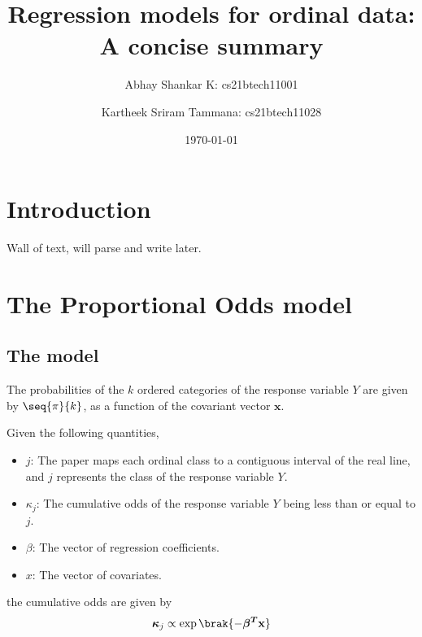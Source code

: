 \documentclass{amsart}
\begin{document}
    \title{Regression models for ordinal data: A concise summary}
    \author{Abhay Shankar K: cs21btech11001}
    \author{Kartheek Sriram Tammana: cs21btech11028}
    \date{\today}
    
    
    \maketitle
    \section{Introduction}

    Wall of text, will parse and write later.

    \section{The Proportional Odds model}
        \subsection{The model}
        The probabilities of the \(k\) ordered categories of the response variable \(Y\) are given by \(\seq{\pi}{k}\), as a function of the covariant vector \(\mathbf{x}\).

        Given the following quantities,
        \begin{itemize}
            \item \(j\): The paper maps each ordinal class to a contiguous interval of the real line, and \(j\) represents the class of the response variable \(Y\).
            \item \(\kappa_j\): The cumulative odds of the response variable \(Y\) being less than or equal to \(j\).
            \item \(\beta\): The vector of regression coefficients.
            \item \(x\): The vector of covariates.
        \end{itemize}

        the cumulative odds are given by
        \[\boldsymbol{\kappa}_j \propto \exp \brak{- \boldsymbol{\beta^T} \mathbf{x}}\]
\end{document}
